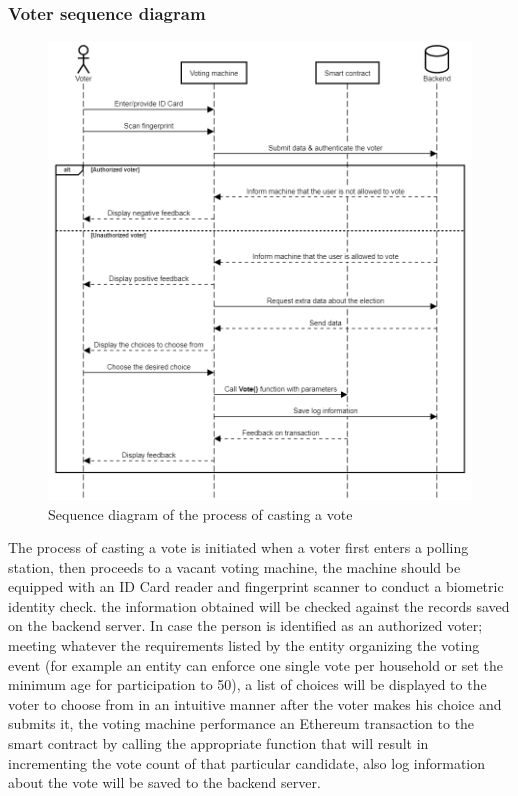 \subsubsection{Voter sequence diagram}

\begin{figure}[H]
	\centering
		\includegraphics[width=14cm]{images/chapter3/voter_sequence_diagram.png}
		\caption{{\footnotesize Sequence diagram of the process of casting a vote}}
\end{figure}

The process of casting a vote is initiated when a voter first enters a polling station, then proceeds to a vacant voting machine, the machine should be equipped with an ID Card reader and fingerprint scanner to conduct a biometric identity check. the information obtained will be checked against the records saved on the backend server. In case the person is identified as an authorized voter; meeting whatever the requirements listed by the entity organizing the voting event (for example an entity can enforce one single vote per household or set the minimum age for participation to 50), a list of choices will be displayed to the voter to choose from in an intuitive manner after the voter makes his choice and submits it, the voting machine performance an Ethereum transaction to the smart contract by calling the appropriate function that will result in incrementing the vote count of that particular candidate, also log information about the vote will be saved to the backend server.
